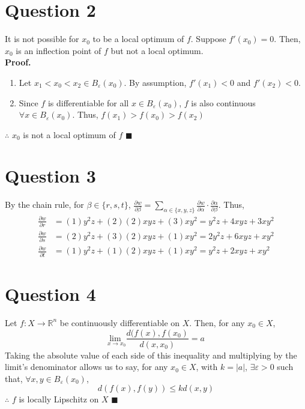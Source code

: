 \documentclass{article}
\newcommand{\R}{\mathbb{R}}
\begin{document}
\section*{Question 2}
It is not possible for $x_0$ to be a local optimum of $f$. Suppose $f'(x_0)=0$. Then, $x_0$ is an inflection point of $f$ but not a local optimum.
\medskip \\
\textbf{Proof.}
\begin{enumerate}
	\item Let $x_1<x_0<x_2\in B_\varepsilon(x_0)$.  By assumption, $f'(x_1)<0$ and $f'(x_2)<0$.
	\item Since $f$ is differentiable for all $x\in  B_\varepsilon(x_0)$, $f$ is also continuous  $\forall x\in  B_\varepsilon(x_0)$. Thus, $f(x_1)>f(x_0)>f(x_2)$
\end{enumerate}
$\therefore$ $x_0$ is not a local optimum of $f$ $\blacksquare$



\section*{Question 3}
By the chain rule, for $\beta\in\{r,s,t\}$, $\frac{\partial w}{\partial\beta}=\sum_{\alpha\in\{x,y,z\}}\frac{\partial w}{\partial\alpha}\cdot\frac{\partial\alpha}{\partial\beta}$. Thus,
\begin{align*}
	\frac{\partial w}{\partial r} &= (1)y^2z + (2)(2)xyz + (3)xy^2 = y^2z  + 4xyz + 3xy^2	\\
	\frac{\partial w}{\partial s} &= (2)y^2z + (3)(2)xyz + (1)xy^2 = 2y^2z + 6xyz + xy^2 	\\
	\frac{\partial w}{\partial t} &= (1)y^2z + (1)(2)xyz + (1)xy^2 = y^2z  + 2xyz + xy^2
\end{align*}



\section*{Question 4}
Let $f:X\rightarrow\R^n$ be continuously differentiable on $X$. Then, for any $x_0\in X$,
\[
	\underset{x\rightarrow x_0}{\text{lim }}\frac{d(f(x),f(x_0)}{d(x,x_0)} = a
\]
Taking the absolute value of each side of this inequality and multiplying by the limit's denominator allows us to say, for any $x_0\in X$, with $k=|a|$, $\exists\varepsilon>0$ such that, $\forall x,y\in B_\varepsilon(x_0)$,
\[
	d(f(x),f(y))\leq kd(x,y)
\]
$\therefore$ $f$ is locally Lipschitz on $X$ $\blacksquare$
\end{document}
